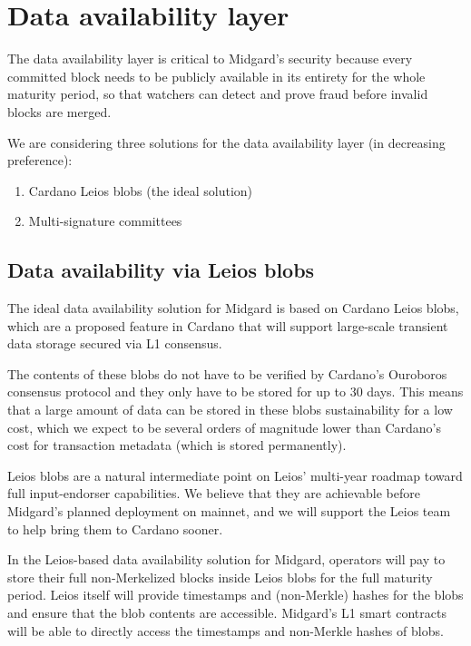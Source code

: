 \documentclass[../midgard.tex]{subfiles}
\begin{document}
\section{Data availability layer}
\label{h:data-availability-layer}

The data availability layer is critical to Midgard's security because every committed block needs to be publicly available in its entirety for the whole maturity period, so that watchers can detect and prove fraud before invalid blocks are merged.

We are considering three solutions for the data availability layer (in decreasing preference):
\begin{enumerate}
  \item Cardano Leios blobs (the ideal solution)
  \item Multi-signature committees
\end{enumerate}

\subsection{Data availability via Leios blobs}
\label{h:data-availability-leios}

The ideal data availability solution for Midgard is based on Cardano Leios blobs, which are a proposed feature in Cardano that will support large-scale transient data storage secured via L1 consensus.

The contents of these blobs do not have to be verified by Cardano's Ouroboros consensus protocol and they only have to be stored for up to 30 days.
This means that a large amount of data can be stored in these blobs sustainability for a low cost, which we expect to be several orders of magnitude lower than Cardano's cost for transaction metadata (which is stored permanently).

Leios blobs are a natural intermediate point on Leios' multi-year roadmap toward full input-endorser capabilities.
We believe that they are achievable before Midgard's planned deployment on mainnet, and we will support the Leios team to help bring them to Cardano sooner.

In the Leios-based data availability solution for Midgard, operators will pay to store their full non-Merkelized blocks inside Leios blobs for the full maturity period.
Leios itself will provide timestamps and (non-Merkle) hashes for the blobs and ensure that the blob contents are accessible.
Midgard's L1 smart contracts will be able to directly access the timestamps and non-Merkle hashes of blobs.
\end{document}
